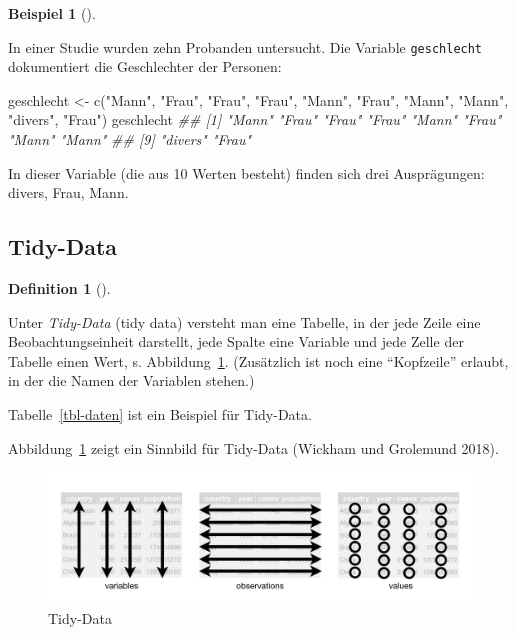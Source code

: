 \documentclass[
  a4paper,
  DIV=11]{scrreprt}
\newenvironment{Shaded}{\begin{snugshade}}{\end{snugshade}}
\newcommand{\DocumentationTok}[1]{\textcolor[rgb]{0.37,0.37,0.37}{\textit{#1}}}
\newcommand{\FunctionTok}[1]{\textcolor[rgb]{0.28,0.35,0.67}{#1}}
\newcommand{\NormalTok}[1]{\textcolor[rgb]{0.00,0.23,0.31}{#1}}
\newcommand{\OtherTok}[1]{\textcolor[rgb]{0.00,0.23,0.31}{#1}}
\newcommand{\StringTok}[1]{\textcolor[rgb]{0.13,0.47,0.30}{#1}}
\theoremstyle{definition}
\newtheorem{definition}{Definition}[chapter]
\theoremstyle{definition}
\newtheorem{example}{Beispiel}[chapter]
\theoremstyle{remark}
\begin{document}
\leavevmode{}%
\begin{example}[]\label{exm-geschlecht}

In einer Studie wurden zehn Probanden untersucht. Die Variable
\texttt{geschlecht} dokumentiert die Geschlechter der Personen:

\begin{Shaded}
\begin{Highlighting}[]
\NormalTok{geschlecht }\OtherTok{\textless{}{-}} \FunctionTok{c}\NormalTok{(}\StringTok{"Mann"}\NormalTok{, }\StringTok{"Frau"}\NormalTok{, }\StringTok{"Frau"}\NormalTok{, }\StringTok{"Frau"}\NormalTok{, }\StringTok{"Mann"}\NormalTok{,}
                \StringTok{"Frau"}\NormalTok{, }\StringTok{"Mann"}\NormalTok{, }\StringTok{"Mann"}\NormalTok{, }\StringTok{"divers"}\NormalTok{, }\StringTok{"Frau"}\NormalTok{)}
\NormalTok{geschlecht}
\DocumentationTok{\#\#  [1] "Mann"   "Frau"   "Frau"   "Frau"   "Mann"   "Frau"   "Mann"   "Mann"  }
\DocumentationTok{\#\#  [9] "divers" "Frau"}
\end{Highlighting}
\end{Shaded}

In dieser Variable (die aus 10 Werten besteht) finden sich drei
Ausprägungen: divers, Frau, Mann.

\end{example}

\hypertarget{tidy-data}{%
\subsection{Tidy-Data}\label{tidy-data}}

\leavevmode{}%
\begin{definition}[]\label{def-tidy}

Unter \emph{Tidy-Data} (tidy data) versteht man eine Tabelle, in der
jede Zeile eine Beobachtungseinheit darstellt, jede Spalte eine Variable
und jede Zelle der Tabelle einen Wert, s. Abbildung~\ref{fig-tidy1}.
(Zusätzlich ist noch eine ``Kopfzeile'' erlaubt, in der die Namen der
Variablen stehen.)

\end{definition}

Tabelle~\ref{tbl-daten} ist ein Beispiel für Tidy-Data.

Abbildung~\ref{fig-tidy1} zeigt ein Sinnbild für Tidy-Data (Wickham und
Grolemund 2018).

\begin{figure}

{\centering \includegraphics{./img/tidy-1.png}

}

\caption{\label{fig-tidy1}Tidy-Data}

\end{figure}
\end{document}
